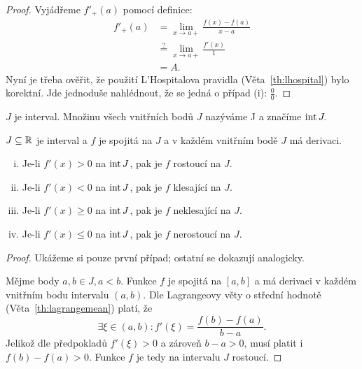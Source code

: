 \begin{proof}
    Vyjádřeme $f'_+(a)$ pomocí definice:
    \begin{align*}
        f'_+(a) &= \lim_{x \to a+} \frac{f(x) - f(a)}{x-a} \\
                &\stackrel{?}{=} \lim_{x \to a+} \frac{f'(x)}{1} 
                    \tag{L'Hospitalovo pravidlo, nutno ověřit podmínky} \\
                &= A.
    \end{align*}
    Nyní je třeba ověřit, že použití L'Hospitalova pravidla 
    (Věta~\ref{th:lhospital}) bylo korektní. Jde jednoduše nahlédnout, že
    se jedná o případ (i): $\frac{0}{0}.$ 
\end{proof}

\begin{definition}
    \Necht $J$ je interval. Množinu všech vnitřních bodů $J$ nazýváme 
     J a značíme $\operatorname{int} J.$
\end{definition}

\begin{theorem}
    \label{th:derivacemonotonie}
    \Necht $J \subseteq \mathbb{R}$ je interval a $f$ je spojitá na $J$ a v každém
    vnitřním bodě $J$ má derivaci.
    \begin{enumerate}[(i)]
        \item Je-li $f'(x) > 0$ na $\operatorname{int} J$, pak je $f$ rostoucí na $J.$
        \item Je-li $f'(x) < 0$ na $\operatorname{int} J$, pak je $f$ klesající na $J.$
        \item Je-li $f'(x) \geq 0$ na $\operatorname{int} J$, pak je $f$ neklesající na $J.$
        \item Je-li $f'(x) \leq 0$ na $\operatorname{int} J$, pak je $f$ nerostoucí na $J.$
    \end{enumerate}
\end{theorem}

\begin{proof}
    Ukážeme si pouze první případ; ostatní se dokazují analogicky.

    Mějme body $a,b \in J, a < b.$ Funkce $f$ je spojitá na $[a,b]$ a má derivaci
    v každém vnitřním bodu intervalu $(a,b).$ Dle Lagrangeovy věty o střední
    hodnotě (Věta~\ref{th:lagrangemean}) platí, že
    $$\exists \xi \in (a,b): f'(\xi) = \frac{f(b) - f(a)}{b-a}.$$ Jelikož
    dle předpokladů $f'(\xi) > 0$ a zároveň $b-a>0$, musí platit i $f(b) - f(a) > 0.$
    Funkce $f$ je tedy na intervalu $J$ rostoucí.
\end{proof}

